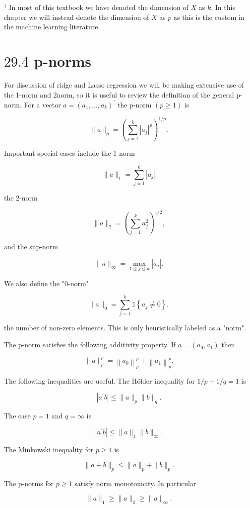 \documentclass[10pt]{article}
\begin{document}
${ }^{1}$ In most of this textbook we have denoted the dimension of $X$ as $k$. In this chapter we will instead denote the dimension of $X$ as $p$ as this is the custom in the machine learning literature.

\section{$29.4$ p-norms}
For discussion of ridge and Lasso regression we will be making extensive use of the 1-norm and 2norm, so it is useful to review the definition of the general p-norm. For a vector $a=\left(a_{1}, \ldots, a_{k}\right)^{\prime}$ the p-norm $(p \geq 1)$ is

$$
\|a\|_{p}=\left(\sum_{j=1}^{k}\left|a_{j}\right|^{p}\right)^{1 / p} .
$$

Important special cases include the 1-norm

$$
\|a\|_{1}=\sum_{j=1}^{k}\left|a_{j}\right|
$$

the 2-norm

$$
\|a\|_{2}=\left(\sum_{j=1}^{k} a_{j}^{2}\right)^{1 / 2},
$$

and the sup-norm

$$
\|a\|_{\infty}=\max _{1 \leq j \leq k}\left|a_{j}\right| .
$$

We also define the "0-norm"

$$
\|a\|_{0}=\sum_{j=1}^{k} \mathbb{1}\left\{a_{j} \neq 0\right\},
$$

the number of non-zero elements. This is only heuristically labeled as a "norm".

The p-norm satisfies the following additivity property. If $a=\left(a_{0}, a_{1}\right)$ then

$$
\|a\|_{p}^{p}=\left\|a_{0}\right\|_{p}^{p}+\left\|a_{1}\right\|_{p}^{p} .
$$

The following inequalities are useful. The Hölder inequality for $1 / p+1 / q=1$ is

$$
\left|a^{\prime} b\right| \leq\|a\|_{p}\|b\|_{q} .
$$

The case $p=1$ and $q=\infty$ is

$$
\left|a^{\prime} b\right| \leq\|a\|_{1}\|b\|_{\infty} .
$$

The Minkowski inequality for $p \geq 1$ is

$$
\|a+b\|_{p} \leq\|a\|_{p}+\|b\|_{p} .
$$

The p-norms for $p \geq 1$ satisfy norm monotonicity. In particular

$$
\|a\|_{1} \geq\|a\|_{2} \geq\|a\|_{\infty} .
$$
\end{document}
